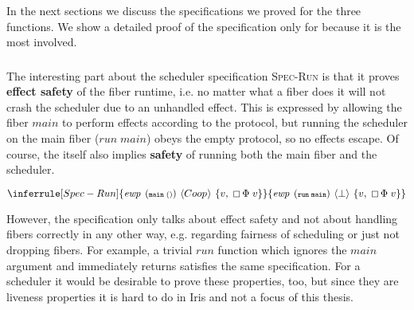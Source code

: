 In the next sections we discuss the specifications we proved for the three functions.
We show a detailed proof of the specification only for  because it is the most involved.

\subsubsection{}
\label{sec:sched-spec-run}

The interesting part about the scheduler specification \textsc{Spec-Run} is that it proves \textbf{effect safety} of the fiber runtime, i.e. no matter what a fiber does it will not crash the scheduler due to an unhandled effect.
This is expressed by allowing the fiber \(main\) to perform effects according to the \proto{} protocol, but running the scheduler on the main fiber (\(run\; main\)) obeys the empty protocol, so no effects escape.
Of course, the \ewpt{} itself also implies \textbf{safety} of running both the main fiber and the scheduler.

\[
  \inferrule[Spec-Run]
  {\ewp{main\; ()}{\proto{}}{v,\; \always \Phi\; v}}
  {\ewp{run\; main}{\bot}{v,\; \always \Phi\; v}}
\]


However, the specification only talks about effect safety and not about handling fibers correctly in any other way, e.g. regarding fairness of scheduling or just not dropping fibers.
For example, a trivial \(run\) function which ignores the \(main\) argument and immediately returns satisfies the same specification.
For a scheduler it would be desirable to prove these properties, too, but since they are liveness properties it is hard to do in Iris and not a focus of this thesis.

